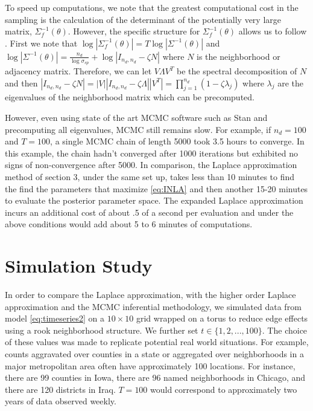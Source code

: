 \documentclass[11pt]{isuthesis}
\begin{document}
	To speed up computations, we note that the greatest computational cost in the sampling is the calculation of the determinant of the potentially very large matrix, $\Sigma_f^{-1}(\theta)$.  However, the specific structure for $\Sigma_f^{-1}(\theta)$ allows us to follow \cite{jin2005generalized}.  First we note that $\log | \Sigma_f^{-1}(\theta)|  = T \log | \Sigma^{-1}(\theta)|$ and $\log|\Sigma^{-1}(\theta)|=\frac{n_d}{\log\sigma_{sp}}+\log|I_{n_d,n_d}-\zeta N|$ where $N$ is the neighborhood or adjacency matrix.  Therefore, we can let $V \Lambda V^T$ be the spectral decomposition of $N$ and then $|I_{n_d,n_d}-\zeta N|=|V| |I_{n_d,n_d}-\zeta \Lambda| |V^T|=\prod_{j=1}^{n_d}\left(1-\zeta \lambda_j\right)$ where $\lambda_j$ are the eigenvalues of the neighborhood matrix which can be precomputed.  
	
	However, even using state of the art MCMC software such as Stan and precomputing all eigenvalues, MCMC still remains slow.  For example, if $n_d=100$ and $T=100$, a single MCMC chain of length 5000 took 3.5 hours to converge.  In this example, the chain hadn't converged after 1000 iterations but exhibited no signs of non-convergence after 5000.  In comparison, the Laplace approximation method of section 3, under the same set up, takes less than 10 minutes to find the find the parameters that maximize \eqref{eq:INLA} and then another 15-20 minutes to evaluate the posterior parameter space.  The expanded Laplace approximation incurs an additional cost of about .5 of a second per evaluation and under the above conditions would add about 5 to 6 minutes of computations.
	
	
	\section{Simulation Study}
	
	In order to compare the Laplace approximation, with the higher order Laplace approximation and the MCMC inferential methodology, we simulated data from model \eqref{eq:timeseries2} on a $10 \times 10$ grid wrapped on a torus to reduce edge effects using a rook neighborhood structure.  We further set $t \in \{1,2,...,100\}$.  The choice of these values was made to replicate potential real world situations.  For example, counts aggravated over counties in a state or aggregated over neighborhoods in a major metropolitan area often have approximately 100 locations.  For instance, there are 99 counties in Iowa, there are 96 named neighborhoods in Chicago, and there are 120 districts in Iraq.  $T=100$ would correspond to approximately two years of data observed weekly.
	
\end{document}
